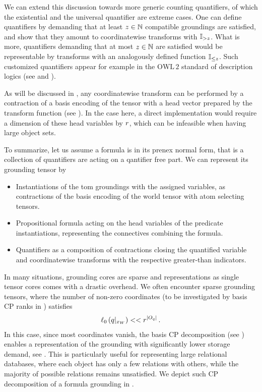 We can extend this discussion towards more generic counting quantifiers, of which the existential and the universal quantifier are extreme cases.
One can define quantifiers by demanding that at least $z\in\mathbb{N}$ compatible groundings are satisfied, and show that they amount to coordinatewise transforms with $\mathbb{I}_{>z}$.
What is more, quantifiers demanding that at most $z\in\mathbb{N}$ are satisfied would be representable by transforms with an analogously defined function $\mathbb{I}_{\leq z}$.
Such customized quantifiers appear for example in the $\mathrm{OWL\,2}$ standard of description logics (see \cite{rudolph_foundations_2011} and ).

As will be discussed in , any coordinatewise transform can be performed by a contraction of a basis encoding of the tensor with a head vector prepared by the transform function (see ).
In the case here, a direct implementation would require a dimension of these head variables by $r$, which can be infeasible when having large object sets.

To summarize, let us assume a formula is in its prenex normal form, that is a collection of quantifiers are acting on a qantifier free part.
We can represent its grounding tensor by
\begin{itemize}
    \item Instantiations of the tom groundings with the assigned variables, as contractions of the basis encoding of the world tensor with atom selecting tensors.
    \item Propositional formula acting on the head variables of the predicate instantiations, representing the connectives combining the formula.
    \item Quantifiers as a composition of contractions closing the quantified variable and coordinatewise transforms with the respective greater-than indicators.
\end{itemize}



\label{sec:basisCPgrounding}

In many situations, grounding cores are sparse and representations as single tensor cores comes with a drastic overhead.
We often encounter sparse grounding tensors, where the number of non-zero coordinates (to be investigated by basis CP ranks in ) satisfies
\begin{align*}
    \ell_0\left({q}|_{x_{W}}\right) << r^{\left|O_{q}\right|} \, .
\end{align*}
In this case, since most coordinates vanish, the basis CP decomposition (see ) enables a representation of the grounding with significantly lower storage demand, see .
This is particularly useful for representing large relational databases, where each object has only a few relations with others, while the majority of possible relations remains unsatisfied.
We depict such CP decomposition of a formula grounding in .

